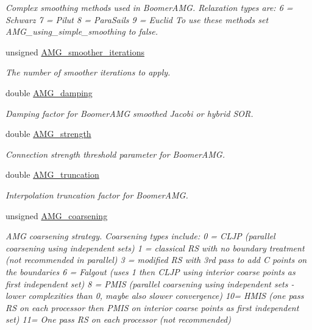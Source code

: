 \begin{DoxyCompactItemize}
\begin{DoxyCompactList}\small\item\em Complex smoothing methods used in Boomer\+A\+MG. Relaxation types are\+: 6 = Schwarz 7 = Pilut 8 = Para\+Sails 9 = Euclid To use these methods set A\+M\+G\+\_\+using\+\_\+simple\+\_\+smoothing to false. \end{DoxyCompactList}\item 
unsigned \hyperlink{classoomph_1_1HypreInterface_a968f16488385d717c96993883cf4a680}{A\+M\+G\+\_\+smoother\+\_\+iterations}
\begin{DoxyCompactList}\small\item\em The number of smoother iterations to apply. \end{DoxyCompactList}\item 
double \hyperlink{classoomph_1_1HypreInterface_abdf7a5f5744201ae75368c2b07f662bc}{A\+M\+G\+\_\+damping}
\begin{DoxyCompactList}\small\item\em Damping factor for Boomer\+A\+MG smoothed Jacobi or hybrid S\+OR. \end{DoxyCompactList}\item 
double \hyperlink{classoomph_1_1HypreInterface_a1e87cc2c06ff1391b293e636b19236ea}{A\+M\+G\+\_\+strength}
\begin{DoxyCompactList}\small\item\em Connection strength threshold parameter for Boomer\+A\+MG. \end{DoxyCompactList}\item 
double \hyperlink{classoomph_1_1HypreInterface_a8fa7abd65dec3d2318a36d8fddb96a46}{A\+M\+G\+\_\+truncation}
\begin{DoxyCompactList}\small\item\em Interpolation truncation factor for Boomer\+A\+MG. \end{DoxyCompactList}\item 
unsigned \hyperlink{classoomph_1_1HypreInterface_a0a75db2a70cfd31653be6681abccffbf}{A\+M\+G\+\_\+coarsening}
\begin{DoxyCompactList}\small\item\em A\+MG coarsening strategy. Coarsening types include\+: 0 = C\+L\+JP (parallel coarsening using independent sets) 1 = classical RS with no boundary treatment (not recommended in parallel) 3 = modified RS with 3rd pass to add C points on the boundaries 6 = Falgout (uses 1 then C\+L\+JP using interior coarse points as first independent set) 8 = P\+M\+IS (parallel coarsening using independent sets -\/ lower complexities than 0, maybe also slower convergence) 10= H\+M\+IS (one pass RS on each processor then P\+M\+IS on interior coarse points as first independent set) 11= One pass RS on each processor (not recommended) \end{DoxyCompactList}\item 

\end{DoxyCompactItemize}
